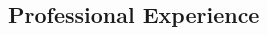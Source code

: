 \documentclass[margin,line, 12pt]{res}
\newenvironment{list2}{
  \begin{list}{$\bullet$}{%
      \setlength{\itemsep}{0.05in}
      \setlength{\parsep}{0in} \setlength{\parskip}{0in}
      \setlength{\topsep}{0.0in} \setlength{\partopsep}{0in}
      \setlength{\leftmargin}{0.2in}}}{\end{list}}
\begin{document}
\begin{spacing}{1.0}
\begin{resume}
\section{Professional \newline Experience}
%

\end{resume}
\end{spacing}
\end{document}
